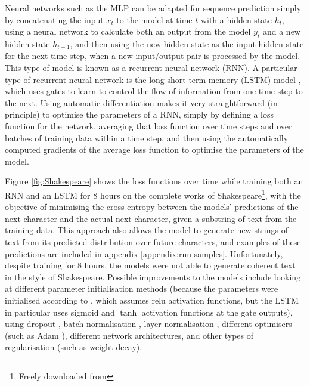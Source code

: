 Neural networks such as the MLP can be adapted for sequence prediction simply by concatenating the input $x_t$ to the model at time $t$ with a hidden state $h_t$, using a neural network to calculate both an output from the model $y_t$ and a new hidden state $h_{t+1}$, and then using the new hidden state as the input hidden state for the next time step, when a new input/output pair is processed by the model. This type of model is known as a recurrent neural network (RNN). A particular type of recurrent neural network is the long short-term memory (LSTM) model \cite{hochreiter1997long}, which uses gates to learn to control the flow of information from one time step to the next. Using automatic differentiation makes it very straightforward (in principle) to optimise the parameters of a RNN, simply by defining a loss function for the network, averaging that loss function over time steps and over batches of training data within a time step, and then using the automatically computed gradients of the average loss function to optimise the parameters of the model.

Figure \ref{fig:Shakespeare} shows the loss functions over time while training both an RNN and an LSTM for 8 hours on the complete works of Shakespeare\footnote{Freely downloaded from }, with the objective of minimising the cross-entropy between the models' predictions of the next character and the actual next character, given a substring of text from the training data. This approach also allows the model to generate new strings of text from its predicted distribution over future characters, and examples of these predictions are included in appendix \ref{appendix:rnn samples}. Unfortunately, despite training for 8 hours, the models were not able to generate coherent text in the style of Shakespeare. Possible improvements to the models include looking at different parameter initialisation methods (because the parameters were initialised according to \cite{he2015delving}, which assumes relu activation functions, but the LSTM in particular uses sigmoid and $\tanh$ activation functions at the gate outputs), using dropout \cite{srivastava2014dropout} \cite{gal2016theoretically}, batch normalisation \cite{ioffe2015batch}, layer normalisation \cite{ba2016layer}, different optimisers (such as Adam \cite{kingma2014adam}), different network architectures, and other types of regularisation (such as weight decay).
